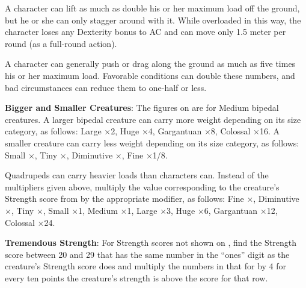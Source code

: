 A character can lift as much as double his or her maximum load off the ground, but he or she can only stagger around with it. While overloaded in this way, the character loses any Dexterity bonus to AC and can move only 1.5 meter per round (as a full-round action).

A character can generally push or drag along the ground as much as five times his or her maximum load. Favorable conditions can double these numbers, and bad circumstances can reduce them to one-half or less.

\textbf{Bigger and Smaller Creatures}: The figures on  are for Medium bipedal creatures. A larger bipedal creature can carry more weight depending on its size category, as follows: Large $\times$2, Huge $\times$4, Gargantuan $\times$8, Colossal $\times$16. A smaller creature can carry less weight depending on its size category, as follows: Small $\times$\threequarters, Tiny $\times$\onehalf, Diminutive $\times$\onequarter, Fine $\times$1/8.

Quadrupeds can carry heavier loads than characters can. Instead of the multipliers given above, multiply the value corresponding to the creature's Strength score from  by the appropriate modifier, as follows: Fine $\times$\onequarter, Diminutive $\times$\onehalf, Tiny $\times$\threequarters, Small $\times$1, Medium $\times$1\onehalf, Large $\times$3, Huge $\times$6, Gargantuan $\times$12, Colossal $\times$24.

\textbf{Tremendous Strength}: For Strength scores not shown on , find the Strength score between 20 and 29 that has the same number in the ``ones'' digit as the creature's Strength score does and multiply the numbers in that for by 4 for every ten points the creature's strength is above the score for that row.